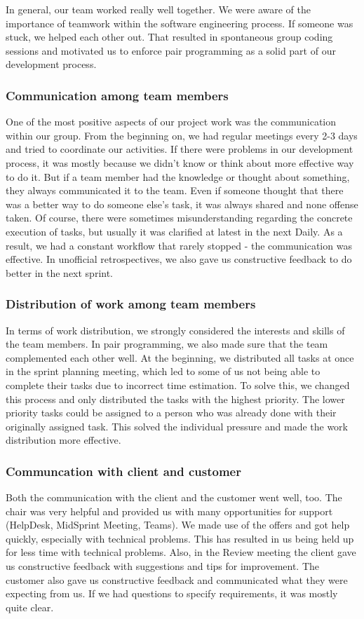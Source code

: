 In general, our team worked really well together.
We were aware of the importance of teamwork within the software engineering process.
If someone was stuck, we helped each other out.
That resulted in spontaneous group coding sessions and motivated us to enforce pair programming as a solid part of our development process.

\subsubsection{Communication among team members}
One of the most positive aspects of our project work was the communication within our group.
From the beginning on, we had regular meetings every 2-3 days and tried to coordinate our activities.
If there were problems in our development process, it was mostly because we didn't know or think about more effective way to do it.
But if a team member had the knowledge or thought about something, they always communicated it to the team.
Even if someone thought that there was a better way to do someone else's task, it was always shared and none offense taken.
Of course, there were sometimes misunderstanding regarding the concrete execution of tasks, but usually it was clarified at latest in the next Daily.
As a result, we had a constant workflow that rarely stopped - the communication was effective.
In unofficial retrospectives, we also gave us constructive feedback to do better in the next sprint.

\subsubsection{Distribution of work among team members}
In terms of work distribution, we strongly considered the interests and skills of the team members.
In pair programming, we also made sure that the team complemented each other well.
At the beginning, we distributed all tasks at once in the sprint planning meeting, which led to some of us not being able to complete their tasks due to incorrect time estimation.
To solve this, we changed this process and only distributed the tasks with the highest priority.
The lower priority tasks could be assigned to a person who was already done with their originally assigned task.
This solved the individual pressure  and made the work distribution more effective.

\subsubsection{Communcation with client and customer}
Both the communication with the client and the customer went well, too.
The chair was very helpful and provided us with many opportunities for support (HelpDesk, MidSprint Meeting, Teams).
We made use of the offers and got help quickly, especially with technical problems.
This has resulted in us being held up for less time with technical problems.
Also, in the Review meeting the client gave us constructive feedback with suggestions and tips for improvement.
The customer also gave us constructive feedback and communicated what they were expecting from us.
If we had questions to specify requirements, it was mostly quite clear.
